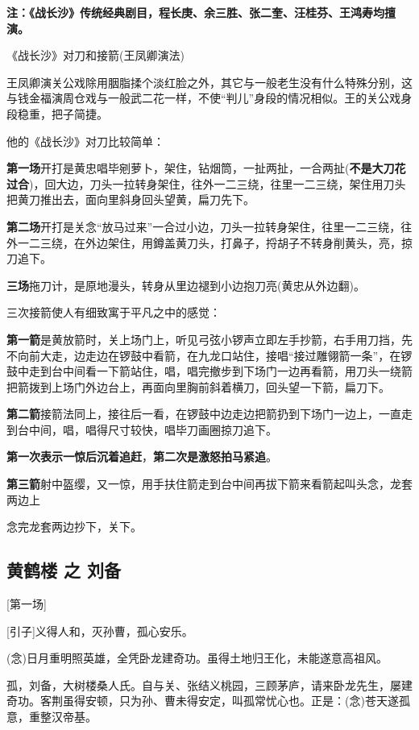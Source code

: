 \textbf{注：《战长沙》传统经典剧目，程长庚、余三胜、张二奎、汪桂芬、王鸿寿均擅演。}

《战长沙》对刀和接箭(王凤卿演法)

王凤卿演关公戏除用胭脂揉个淡红脸之外，其它与一般老生没有什么特殊分别，这与钱金福演周仓戏与一般武二花一样，不使``判儿''身段的情况相似。王的关公戏身段稳重，把子简捷。

他的《战长沙》对刀比较简单：

\textbf{第一场}开打是黄忠唱毕剜萝卜，架住，钻烟筒，一扯两扯，一合两扯(\textbf{不是大刀花过合})，回大边，刀头一拉转身架住，往外一二三绕，往里一二三绕，架住用刀头把黄刀推出去，面向里斜身回头望黄，扁刀先下。

\textbf{第二场}开打是关念``放马过来''一合过小边，刀头一拉转身架住，往里一二三绕，往外一二三绕，在外边架住，用鐏盖黄刀头，打鼻子，捋胡子不转身削黄头，亮，掠刀追下。

\textbf{三场}拖刀计，是原地漫头，转身从里边褪到小边抱刀亮(黄忠从外边翻)。

三次接箭使人有细致寓于平凡之中的感觉：

\textbf{第一箭}是黄放箭时，关上场门上，听见弓弦小锣声立即左手抄箭，右手用刀挡，先不向前大走，边走边在锣鼓中看箭，在九龙口站住，接唱``接过雕翎箭一条''，在锣鼓中走到台中间看一下箭站住，唱，唱完撤步到下场门一边再看箭，用刀头一绕箭把箭拨到上场门外边台上，再面向里胸前斜着横刀，回头望一下箭，扁刀下。

\textbf{第二箭}接箭法同上，接往后一看，在锣鼓中边走边把箭扔到下场门一边上，一直走到台中间，唱，唱得尺寸较快，唱毕刀画圈掠刀追下。

\textbf{第一次表示一惊后沉着追赶}，\textbf{第二次是激怒拍马紧追}。

\textbf{第三箭}射中盔缨，又一惊，用手扶住箭走到台中间再拔下箭来看箭起叫头念，龙套两边上

念完龙套两边抄下，关下。

\newpage
\hypertarget{ux9ec4ux9e64ux697c-ux4e4b-ux5218ux5907}{%
\subsection{黄鹤楼 之
刘备}\label{ux9ec4ux9e64ux697c-ux4e4b-ux5218ux5907}}

{[}第一场{]}

{[}引子{]}义得人和，灭孙曹，孤心安乐。

(念)日月重明照英雄，全凭卧龙建奇功。虽得土地归王化，未能遂意高祖风。

孤，刘备，大树楼桑人氏。自与关、张结义桃园，三顾茅庐，请来卧龙先生，屡建奇功。客荆虽得安顿，只为孙、曹未得安定，叫孤常忧心也。正是：(念)苍天遂孤意，重整汉帝基。

